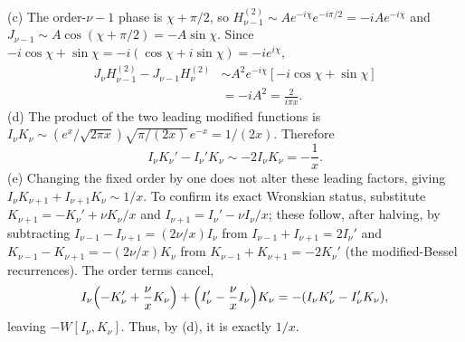 (c) The order-$\nu-1$ phase is $\chi+\pi/2$, so
$H_{\nu-1}^{(2)}\sim Ae^{-i\chi}e^{-i\pi/2}=-iAe^{-i\chi}$ and
$J_{\nu-1}\sim A\cos(\chi+\pi/2)=-A\sin\chi$. Since
$-i\cos\chi+\sin\chi=-i(\cos\chi+i\sin\chi)=-ie^{i\chi}$,
\begin{align*}
J_\nu H_{\nu-1}^{(2)}-J_{\nu-1}H_\nu^{(2)}
&\sim A^2e^{-i\chi}[-i\cos\chi+\sin\chi]\\
&=-iA^2=\boxed{\frac2{i\pi x}}.
\end{align*}
(d) The product of the two leading modified functions is
$I_\nu K_\nu\sim(e^x/\sqrt{2\pi x})\sqrt{\pi/(2x)}\,e^{-x}=1/(2x)$.
Therefore
\[
I_\nu K_\nu'-I_\nu'K_\nu\sim-2I_\nu K_\nu
=\boxed{-\frac1x}.
\]
(e) Changing the fixed order by one does not alter these leading
factors, giving $I_\nu K_{\nu+1}+I_{\nu+1}K_\nu\sim1/x$.
To confirm its exact Wronskian status, substitute
$K_{\nu+1}=-K_\nu'+\nu K_\nu/x$ and
$I_{\nu+1}=I_\nu'-\nu I_\nu/x$; these follow, after halving, by
subtracting $I_{\nu-1}-I_{\nu+1}=(2\nu/x)I_\nu$ from
$I_{\nu-1}+I_{\nu+1}=2I_\nu'$ and
$K_{\nu-1}-K_{\nu+1}=-(2\nu/x)K_\nu$ from
$K_{\nu-1}+K_{\nu+1}=-2K_\nu'$ (the modified-Bessel recurrences).
The order terms cancel,
\[
I_\nu\Bigl(-K_\nu'+\frac\nu xK_\nu\Bigr)
+\Bigl(I_\nu'-\frac\nu xI_\nu\Bigr)K_\nu
=-(I_\nu K_\nu'-I_\nu'K_\nu),
\]
leaving $-W[I_\nu,K_\nu]$. Thus, by (d), it is exactly $\boxed{1/x}$.

